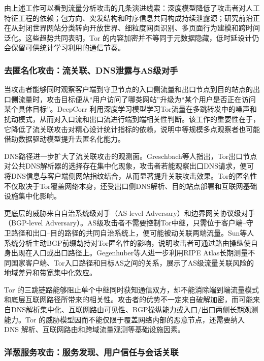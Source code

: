 由上述工作可以看到流量分析攻击的几条演进线索：深度模型降低了攻击者对人工特征工程的依赖；包方向、突发结构和时序信息共同构成持续泄露源；研究前沿正在从封闭世界网站分类转向开放世界、细粒度网页识别、多页面行为建模和跨时间泛化。这些趋势共同表明，Tor 的内容加密并不等同于元数据隐藏，低时延设计仍会保留可供统计学习利用的通信节奏。

\subsubsection{去匿名化攻击：流关联、DNS泄露与AS级对手}

当攻击者能够同时观察客户端到守卫节点的入口侧流量和出口节点到目的站点的出口侧流量时，攻击目标便从“用户访问了哪类网站”升级为“某个用户是否正在访问某个具体目标”。DeepCorr 利用深度学习模型学习Tor流量在多跳转发中的噪声和扰动模式，从而对入口流和出口流进行端到端相关性判断\cite{nasr2018deepcorr}。该工作的重要性在于，它降低了流关联攻击对精心设计统计指标的依赖，说明中等规模多点观察者也可能借助数据驱动模型提升去匿名化能力。

DNS路径进一步扩大了流关联攻击的观测面。Greschbach等人指出，Tor出口节点对公共DNS解析器的选择存在集中化现象，攻击者若能观察出口DNS请求，便可将DNS信息与客户端侧网站指纹结合，从而显著提升关联攻击效果\cite{greschbach2016effect}。Tor的匿名性不仅取决于Tor覆盖网络本身，还受出口侧DNS解析、目的站点部署和互联网基础设施集中化影响。

更底层的威胁来自自治系统级对手（AS-level Adversary）和边界网关协议级对手（BGP-level Adversary）。AS级攻击者不需要控制Tor中继，只需位于客户端--守卫路径和出口--目的路径的共同自治系统上，便可能被动关联两端流量。Sun等人系统分析主动BGP前缀劫持对Tor匿名性的影响，说明攻击者可通过路由操纵使自身出现在入口或出口路径上\cite{sun2017counter}。Gegenhuber等人进一步利用RIPE Atlas长期测量不同国家客户端、Tor入口路径和目标AS之间的关系，展示了AS级流量关联风险的地域差异和带宽集中化效应\cite{gegenhuber2023extended}。

Tor 的三跳链路能够阻止单个中继同时获知通信双方，却不能消除端到端流量模式和底层互联网路径所带来的相关性。攻击者的优势不一定来自破解加密，而可能来自DNS解析集中化、互联网路由可见性、BGP操纵能力或入口/出口两侧长期观测能力。Tor 的威胁模型因而不能仅限于覆盖网络内部的恶意节点，还需要纳入 DNS 解析、互联网路由和跨域流量观测等基础设施因素。

\subsubsection{洋葱服务攻击：服务发现、用户信任与会话关联}


